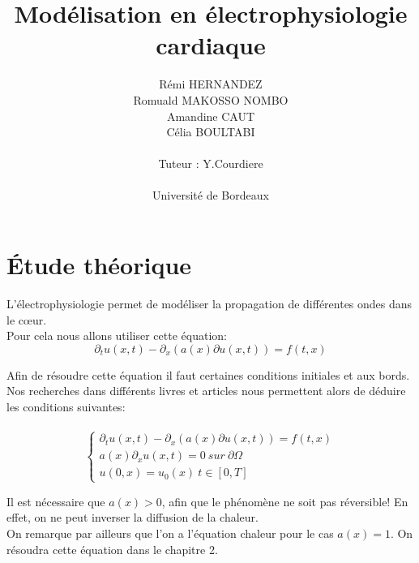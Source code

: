 \documentclass[a4paper,12pt,twoside]{report}
\title{
\vspace*{1in}
\textbf{Modélisation en électrophysiologie cardiaque}}
\author{Rémi HERNANDEZ\\
        Romuald MAKOSSO NOMBO\\
        Amandine CAUT\\
        Célia BOULTABI\\
		\vspace*{0.5in} \\		
		Tuteur : Y.Courdiere \\	
		\vspace*{0.5in} \\		
		Université de Bordeaux\\		
       }
\begin{document}
\maketitle %




\pagebreak
\hspace{0pt}

\vfill
\hspace{0pt}
\pagebreak




\cleardoublepage
\tableofcontents %



\chapter{Étude théorique} 

L'électrophysiologie permet de modéliser la propagation de différentes ondes dans le cœur. \\
Pour cela nous allons utiliser cette équation:\\

$$\partial_t u(x,t) - \partial_x(a(x) \partial u(x,t)) = f(t,x)$$

Afin de résoudre cette équation il faut certaines conditions initiales et aux bords. Nos recherches dans différents livres et articles nous permettent alors de déduire les conditions suivantes: \\
\\
$$ 
\left\{ 
	\begin{array}{ll}
		\partial_t u(x,t) - \partial_x(a(x) \partial u(x,t)) = f(t,x) \\
		a(x) \partial_x u(x,t) = 0 \ sur \  \partial \Omega\\
		u(0,x) = u_0(x) \ t \in [0,T]
		
	\end{array}
\right. 
$$


Il est nécessaire que $a(x) > 0$, afin que le phénomène ne soit pas réversible! En effet, on ne peut inverser la diffusion de la chaleur. \\ 
On remarque par ailleurs que l'on a l'équation chaleur pour le cas $a(x) = 1$. On résoudra cette équation dans le chapitre 2.
\end{document}
